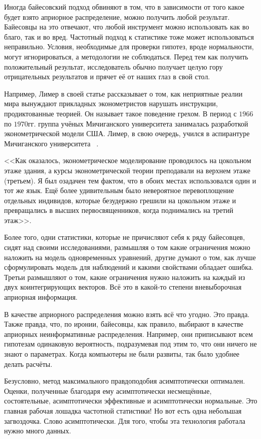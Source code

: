 \documentclass[12pt, a4paper, oneside]{extreport}
\theoremstyle{plain}              %
\theoremstyle{definition}         %
\begin{document}
Иногда байесовский подход обвиняют в том, что в зависимости от того какое будет взято априорное распределение, можно получить любой результат. Байесовцы на это отвечают, что любой инструмент можно использовать как во благо, так и во вред. Частотный подход к статистике тоже может использоваться неправильно. Условия, необходимые для проверки гипотез, вроде нормальности, могут игнорироваться, а методологии не соблюдаться. Перед тем как получить положительный результат, исследователь обычно получает целую гору отрицательных результатов и прячет её от наших глаз в свой стол.

Например, Лимер в своей статье рассказывает о том, как неприятные реалии мира вынуждают прикладных эконометристов нарушать инструкции, продиктованные теорией. Он называет такое поведение грехом. В период с $1966$ по $1970$гг. группа учёных Мичиганского университета занималась разработкой эконометрической модели США. Лимер, в свою очередь, учился в аспирантуре Мичиганского университета~ \cite{leamer1978specification}.

<<Как оказалось, эконометрическое моделирование проводилось на цокольном этаже здания, а курсы эконометрической теории преподавали на верхнем этаже (третьем). Я был озадачен тем фактом, что в обоих местах использовался один и тот же язык. Ещё более удивительным было невероятное перевоплощение отдельных индивидов, которые безудержно грешили на цокольном этаже и превращались в высших первосвященников, когда поднимались на третий этаж>>.

Более того, одни статистики, которые не причисляют себя к ряду байесовцев, сидят над своими исследованиями, размышляя о том какие ограничения можно наложить на модель одновременных уравнений, другие думают о том, как лучше сформулировать модель для наблюдений и какими свойствами обладает ошибка. Третьи размышляют о том, какие ограничения нужно наложить на каждый из двух коинтегрирующих векторов. Всё это в какой-то степени вневыборочная априорная информация.

В качестве априорного распределения можно взять всё что угодно. Это правда. Также правда, что, по иронии, байесовцы, как правило, выбирают в качестве априорных неинформативные распределения. Например, они приписывают всем гипотезам одинаковую вероятность, подразумевая под этим то, что они ничего не знают о параметрах. Когда компьютеры не были развиты, так было удобнее делать расчёты.

Безусловно, метод максимального правдоподобия асимптотически оптимален. Оценки, полученные благодаря ему асимптотически несмещённые, состоятельные, асимптотически эффективные и асимптотически нормальные. Это главная рабочая лошадка частотной статистики! Но вот есть одна небольшая загвоздочка. Слово асимптотически. Для того, чтобы эта технология работала нужно много данных. 
\end{document}
